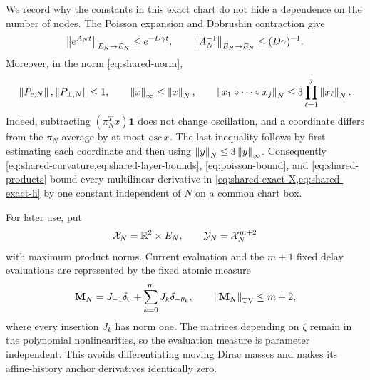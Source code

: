 We record why the constants in this exact chart do not hide a dependence on
the number of nodes.  The Poisson expansion and Dobrushin contraction give
\begin{equation}
 \left\lVert e^{A_Nt}\right\rVert_{E_N\to E_N}\le e^{-D\gamma t},
 \qquad \left\lVert A_N^{-1}\right\rVert_{E_N\to E_N}\le(D\gamma)^{-1}.
                                                               \label{eq:poisson-bound}
\end{equation}
Moreover, in the norm \cref{eq:shared-norm},
\begin{equation}
 \left\lVert P_{c,N}\right\rVert,\left\lVert P_{\perp,N}\right\rVert\le1,\qquad
 \left\lVert x\right\rVert_\infty\le\left\lVert x\right\rVert_N,\qquad
 \left\lVert x_1\circ\cdots\circ x_j\right\rVert_N
 \le3\prod_{\ell=1}^j\left\lVert x_\ell\right\rVert_N.               \label{eq:shared-products}
\end{equation}
Indeed, subtracting \((\pi_N^Tx)\mathbf1\) does not change oscillation,
and a coordinate differs from the \(\pi_N\)-average by at most
\(\operatorname{osc} x\).  The last inequality follows by first estimating each
coordinate and then using \(\left\lVert y\right\rVert_N\le3\left\lVert y\right\rVert_\infty\).
Consequently \cref{eq:shared-curvature,eq:shared-layer-bounds},
\cref{eq:poisson-bound}, and \cref{eq:shared-products} bound every
multilinear derivative in \cref{eq:shared-exact-X,eq:shared-exact-h} by one
constant independent of \(N\) on a common chart box.

For later use, put
\[
 \mathcal X_N=\mathbb R^2\times E_N,
 \qquad
 \mathcal Y_N=\mathcal X_N^{m+2}
\]
with maximum product norms.  Current evaluation and the \(m+1\) fixed
delay evaluations are represented by the fixed atomic measure
\begin{equation}
 \mathbf M_N=J_{-1}\delta_0+\sum_{k=0}^mJ_k\delta_{-\theta_k},
 \qquad \left\lVert\mathbf M_N\right\rVert_{\rm TV}\le m+2,           \label{eq:shared-evaluation-TV}
\end{equation}
where every insertion \(J_k\) has norm one.  The matrices depending on
\(\zeta\) remain in the polynomial nonlinearities, so the evaluation
measure is parameter independent.  This avoids differentiating moving
Dirac masses and makes its affine-history anchor derivatives identically
zero.

